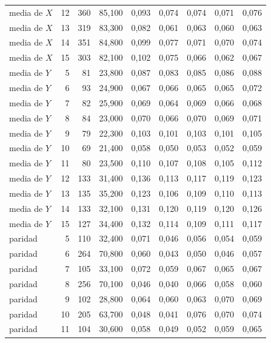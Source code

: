 \begin{table}[htbp]
{\begin{tabular}{@{}lrrrrrrrr@{}}
        media de $X$ & 12 & 360 & 85,100 & 0,093 & 0,074 & 0,074 & 0,071 & 0,076 \\
        media de $X$ & 13 & 319 & 83,300 & 0,082 & 0,061 & 0,063 & 0,060 & 0,063 \\
        media de $X$ & 14 & 351 & 84,800 & 0,099 & 0,077 & 0,071 & 0,070 & 0,074 \\
        media de $X$ & 15 & 303 & 82,100 & 0,102 & 0,075 & 0,066 & 0,062 & 0,067 \\
        media de $Y$ & 5 & 81 & 23,800 & 0,087 & 0,083 & 0,085 & 0,086 & 0,088 \\
        media de $Y$ & 6 & 93 & 24,900 & 0,067 & 0,066 & 0,065 & 0,065 & 0,072 \\
        media de $Y$ & 7 & 82 & 25,900 & 0,069 & 0,064 & 0,069 & 0,066 & 0,068 \\
        media de $Y$ & 8 & 84 & 23,000 & 0,070 & 0,066 & 0,070 & 0,069 & 0,071 \\
        media de $Y$ & 9 & 79 & 22,300 & 0,103 & 0,101 & 0,103 & 0,101 & 0,105 \\
        media de $Y$ & 10 & 69 & 21,400 & 0,058 & 0,050 & 0,053 & 0,052 & 0,059 \\
        media de $Y$ & 11 & 80 & 23,500 & 0,110 & 0,107 & 0,108 & 0,105 & 0,112 \\
        media de $Y$ & 12 & 133 & 31,400 & 0,136 & 0,113 & 0,117 & 0,119 & 0,123 \\
        media de $Y$ & 13 & 135 & 35,200 & 0,123 & 0,106 & 0,109 & 0,110 & 0,113 \\
        media de $Y$ & 14 & 133 & 32,100 & 0,131 & 0,120 & 0,119 & 0,120 & 0,126 \\
        media de $Y$ & 15 & 127 & 34,400 & 0,132 & 0,114 & 0,109 & 0,111 & 0,117 \\
        paridad & 5 & 110 & 32,400 & 0,071 & 0,046 & 0,056 & 0,054 & 0,059 \\
        paridad & 6 & 264 & 70,800 & 0,060 & 0,043 & 0,050 & 0,046 & 0,057 \\
        paridad & 7 & 105 & 33,100 & 0,072 & 0,059 & 0,067 & 0,065 & 0,067 \\
        paridad & 8 & 256 & 70,100 & 0,046 & 0,040 & 0,066 & 0,058 & 0,060 \\
        paridad & 9 & 102 & 28,800 & 0,064 & 0,060 & 0,063 & 0,070 & 0,069 \\
        paridad & 10 & 205 & 63,700 & 0,048 & 0,041 & 0,076 & 0,070 & 0,074 \\
        paridad & 11 & 104 & 30,600 & 0,058 & 0,049 & 0,052 & 0,059 & 0,065 \\

\end{tabular}}
\end{table}
